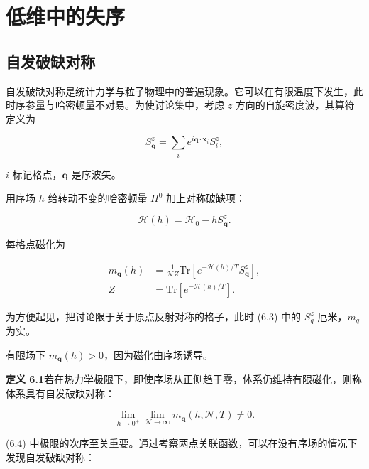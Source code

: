 \chapter{低维中的失序}

\section{自发破缺对称}

自发破缺对称是统计力学与粒子物理中的普遍现象。它可以在有限温度下发生，此时序参量与哈密顿量不对易。为使讨论集中，考虑 $z$ 方向的自旋密度波，其算符定义为

\begin{equation*}
S _ {\mathbf {q}} ^ {z} = \sum_ {i} e ^ {i \mathbf {q} \cdot \mathbf {x} _ {i}} S _ {i} ^ {z} ,
\tag{6.1}
\end{equation*}

$i$ 标记格点，$\mathbf{q}$ 是序波矢。

用序场 $h$ 给转动不变的哈密顿量 $H^{0}$ 加上对称破缺项：

\begin{equation*}
\mathcal {H} ( h ) = \mathcal {H} _ {0} - h S _ {\mathbf {q}} ^ {z}.
\tag{6.2}
\end{equation*}

每格点磁化为

\begin{align*}
m _ {\mathbf {q}} ( h ) & = \frac {1}{\mathcal {N} Z} \mathrm{Tr} \left[ e ^ {- \mathcal {H} ( h ) / T} S _ {\mathbf {q}} ^ {z} \right] ,\\
Z & = \mathrm{Tr} \left[ e ^ {- \mathcal {H} ( h ) / T} \right].
\tag{6.3}
\end{align*}

为方便起见，把讨论限于关于原点反射对称的格子，此时 (6.3) 中的 $S_{q}^{z}$ 厄米，$m_{q}$ 为实。

有限场下 $m_{\mathbf{q}}(h) > 0$，因为磁化由序场诱导。

\medskip
\noindent\textbf{定义 6.1}\quad 若在热力学极限下，即使序场从正侧趋于零，体系仍维持有限磁化，则称体系具有自发破缺对称：

\begin{equation*}
\lim _ {h \to 0 ^ {+}} \lim _ {\mathcal {N} \to \infty} m _ {\mathbf {q}} ( h, \mathcal {N}, T ) \neq 0.
\tag{6.4}
\end{equation*}
\medskip

(6.4) 中极限的次序至关重要。通过考察两点关联函数，可以在没有序场的情况下发现自发破缺对称：

